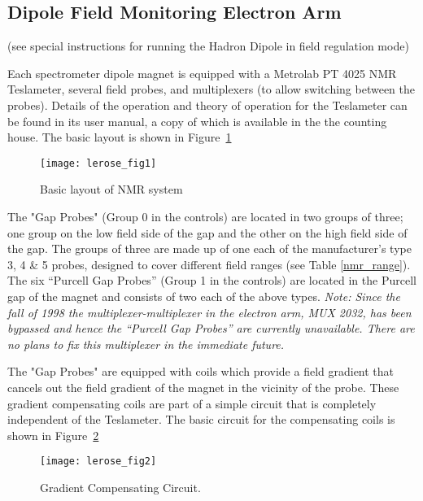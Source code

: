 {\subsection{ Dipole Field Monitoring Electron Arm}

\noindent (see special instructions for running the Hadron Dipole in field 
regulation mode)


Each spectrometer dipole magnet is equipped with a Metrolab PT 4025 
NMR Teslameter, several field probes, and multiplexers (to allow switching 
between the probes).  Details of the operation and theory of operation 
for the Teslameter can be found in its user manual, 
a copy of which is available in the the counting house.
The basic layout is shown in Figure~\ref{fig:nmrbasic}


\begin{figure}
\begin{center}
\texttt{[image: lerose\_fig1]}
{\linespread{1.}
\caption[Spectrometers: NMR System Layout]{Basic layout of NMR system}
\label{fig:nmrbasic}}
\end{center}
\end{figure}


 The "Gap Probes" (Group 0 in the controls) are located in two groups 
of three; one group on the low field side of the gap and the other on the high 
field side of the gap.  The groups of three are made up of one each of 
the manufacturer's type 3, 4 \& 5 probes, designed to cover different 
field ranges (see Table \ref{nmr_range}).  The six ``Purcell Gap Probes'' (Group 1 in 
the controls) are located in the Purcell gap of the magnet 
and consists of two each of the above types. {\em Note: Since
the fall of 1998 the multiplexer-multiplexer in the electron arm,
MUX 2032, has been bypassed and hence the ``Purcell Gap Probes'' are currently
unavailable. There are no plans to fix this multiplexer in the
immediate future.}

 The "Gap Probes" are equipped with coils which provide a field 
gradient that cancels out the field gradient of the magnet in the vicinity of 
the probe.  These gradient compensating coils are part of a simple circuit 
that is completely independent of the Teslameter.  The basic circuit for 
the compensating coils is shown in Figure~\ref{fig:nmrcir}


\begin{figure}
\begin{center}
\texttt{[image: lerose\_fig2]}
{\linespread{1.}
\caption[Spectrometers: NMR Gradient Compensation]{Gradient Compensating Circuit.}
\label{fig:nmrcir}}
\end{center}
\end{figure}


}
